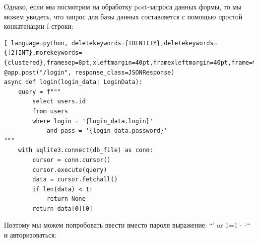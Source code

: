 \documentclass[a4paper,12pt]{diplom}
\begin{document}
	 Однако, если мы посмотрим на обработку post-запроса данных формы, то мы можем увидеть, что запрос для базы данных составляется с помощью простой конкатенации f-строки:
	 \begin{lstlisting}[ language=python, deletekeywords={IDENTITY},deletekeywords={[2]INT},morekeywords={clustered},framesep=8pt,xleftmargin=40pt,framexleftmargin=40pt,frame=tb,framerule=0pt]    
@app.post("/login", response_class=JSONResponse)
async def login(login_data: LoginData):
	query = f"""
		select users.id
		from users
		where login = '{login_data.login}' 
			and pass = '{login_data.password}'
"""
	with sqlite3.connect(db_file) as conn:
		cursor = conn.cursor()
		cursor.execute(query)
		data = cursor.fetchall()
		if len(data) < 1:
			return None
		return data[0][0]
	 \end{lstlisting}
	 
	 Поэтому мы можем попробовать ввести вместо пароля выражение: ``' or 1=1 - -`` и авторизоваться:
	 
\end{document}
